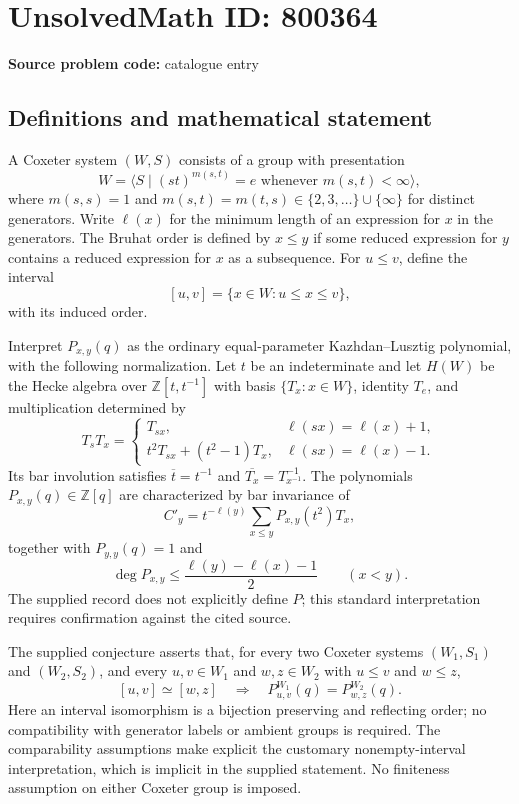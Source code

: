 \documentclass[11pt]{article}
\newcommand{\Z}{\mathbb{Z}}
\begin{document}
\section*{UnsolvedMath ID: 800364}
\textbf{Source problem code:} catalogue entry
\subsection{Definitions and mathematical statement}
A Coxeter system \((W,S)\) consists of a group with presentation
\[
W=\langle S\mid (st)^{m(s,t)}=e\text{ whenever }m(s,t)<\infty\rangle,
\]
where \(m(s,s)=1\) and \(m(s,t)=m(t,s)\in\{2,3,\ldots\}\cup\{\infty\}\) for distinct generators. Write \(\ell(x)\) for the minimum length of an expression for \(x\) in the generators. The Bruhat order is defined by \(x\leq y\) if some reduced expression for \(y\) contains a reduced expression for \(x\) as a subsequence. For \(u\leq v\), define the interval
\[
[u,v]=\{x\in W:u\leq x\leq v\},
\]
with its induced order.

Interpret \(P_{x,y}(q)\) as the ordinary equal-parameter Kazhdan--Lusztig polynomial, with the following normalization. Let \(t\) be an indeterminate and let \(H(W)\) be the Hecke algebra over \(\Z[t,t^{-1}]\) with basis \(\{T_x:x\in W\}\), identity \(T_e\), and multiplication determined by
\[
T_sT_x=\begin{cases}
T_{sx},&\ell(sx)=\ell(x)+1,\\
t^2T_{sx}+(t^2-1)T_x,&\ell(sx)=\ell(x)-1.
\end{cases}
\]
Its bar involution satisfies \(\overline{t}=t^{-1}\) and \(\overline{T_x}=T_{x^{-1}}^{-1}\). The polynomials \(P_{x,y}(q)\in\Z[q]\) are characterized by bar invariance of
\[
C'_y=t^{-\ell(y)}\sum_{x\leq y}P_{x,y}(t^2)T_x,
\]
together with \(P_{y,y}(q)=1\) and
\[
\deg P_{x,y}\leq\frac{\ell(y)-\ell(x)-1}{2}\qquad(x<y).
\]
The supplied record does not explicitly define \(P\); this standard interpretation requires confirmation against the cited source.

The supplied conjecture asserts that, for every two Coxeter systems \((W_1,S_1)\) and \((W_2,S_2)\), and every \(u,v\in W_1\) and \(w,z\in W_2\) with \(u\leq v\) and \(w\leq z\),
\[
[u,v]\simeq[w,z]\quad\Longrightarrow\quad
P^{W_1}_{u,v}(q)=P^{W_2}_{w,z}(q).
\]
Here an interval isomorphism is a bijection preserving and reflecting order; no compatibility with generator labels or ambient groups is required. The comparability assumptions make explicit the customary nonempty-interval interpretation, which is implicit in the supplied statement. No finiteness assumption on either Coxeter group is imposed.
\end{document}
